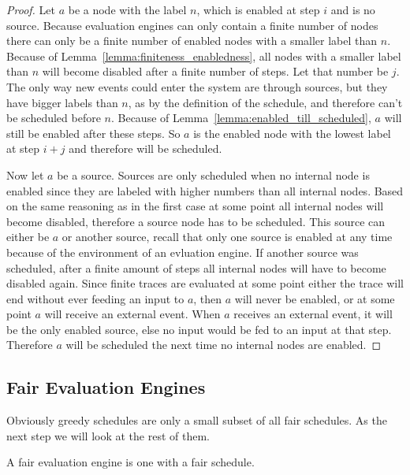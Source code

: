 \begin{proof}
  Let \(a\) be a node with the label \(n\), which is enabled at step \(i\) and is no source.
  Because evaluation engines can only contain a finite number of nodes there can only be a finite number of enabled nodes with a smaller label than \(n\).
  Because of Lemma~\ref{lemma:finiteness_enabledness}, all nodes with a smaller label than \(n\) will become disabled after a finite number of steps.
  Let that number be \(j\).
  The only way new events could enter the system are through sources, but they have bigger labels than \(n\), as by the definition of the schedule, and therefore can't be scheduled before \(n\).
  Because of Lemma~\ref{lemma:enabled_till_scheduled}, \(a\) will still be enabled after these steps.
  So \(a\) is the enabled node with the lowest label at step \(i + j\) and therefore will be scheduled.

  Now let \(a\) be a source.
  Sources are only scheduled when no internal node is enabled since they are labeled with higher numbers than all internal nodes.
  Based on the same reasoning as in the first case at some point all internal nodes will become disabled, therefore a source node has to be scheduled.
  This source can either be \(a\) or another source, recall that only one source is enabled at any time because of the environment of an evluation engine.
  If another source was scheduled, after a finite amount of steps all internal nodes will have to become disabled again.
  Since finite traces are evaluated at some point either the trace will end without ever feeding an input to \(a\), then \(a\) will never be enabled, or at some point \(a\) will receive an external event.
  When \(a\) receives an external event, it will be the only enabled source, else no input would be fed to an input at that step.
  Therefore \(a\) will be scheduled the next time no internal nodes are enabled.
\end{proof}


\subsection{Fair Evaluation Engines}
\label{sec:behaviours:behaviour_without_timing:fair}

Obviously greedy schedules are only a small subset of all fair schedules.
As the next step we will look at the rest of them.

\begin{definition}[name = Fair Evaluation Engines]\label{def:fair_evaluation_engines}
  A fair evaluation engine is one with a fair schedule.
\end{definition}


